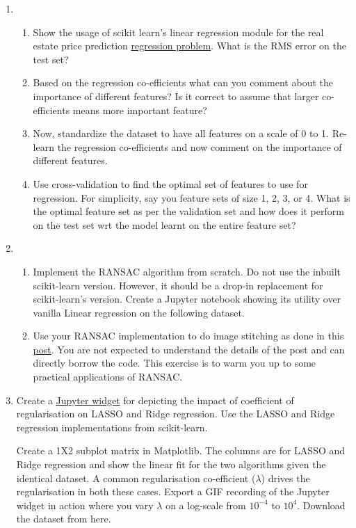 \documentclass[]{article}
\begin{document}
\begin{enumerate}
	
	\item 
\begin{enumerate}
	\item 	Show the usage of scikit learn's linear regression module for the real estate price prediction \href{https://archive.ics.uci.edu/ml/datasets/Real+estate+valuation+data+set}{regression problem}.  What is the RMS error on the test set? 
	\item Based on the regression co-efficients what can you comment about the importance of different features? Is it correct to assume that larger co-efficients means more important feature?
	\item Now, standardize the dataset to have all features on a scale of 0 to 1. Re-learn the regression co-efficients and now comment on the importance of different features.
	\item Use cross-validation to find the optimal set of features to use for regression. For simplicity, say you feature sets of size 1, 2, 3, or 4. What is the optimal feature set as per the validation set and how does it perform on the test set wrt the model learnt on the entire feature set?
	
\end{enumerate}

\item \begin{enumerate}
	\item Implement the RANSAC algorithm from scratch. Do not use the inbuilt scikit-learn version. However, it should be a drop-in replacement for scikit-learn's version. Create a Jupyter notebook showing its utility over vanilla Linear regression on the following dataset.
	\item Use your RANSAC implementation to do image stitching as done in this \href{https://www.pyimagesearch.com/2016/01/11/opencv-panorama-stitching/}{post}. You are not expected to understand the details of the post and can directly borrow the code. This exercise is to warm you up to some practical applications of RANSAC.
\end{enumerate}

\item Create a \href{https://ipywidgets.readthedocs.io/en/stable/examples/Widget\%20Basics.html}{Jupyter widget} for depicting the impact of coefficient of regularisation on LASSO and Ridge regression. Use the LASSO and Ridge regression implementations from scikit-learn.

Create a 1X2 subplot matrix in Matplotlib. The columns are for LASSO and Ridge regression and show the linear fit for the two algorithms given the identical dataset. A common regularisation co-efficient ($\lambda$) drives the regularisation in both these cases. Export a GIF recording of the Jupyter widget in action where you vary $\lambda$ on a log-scale from $10^{-4}$ to $10^{4}$. Download the dataset from here.


\end{enumerate}
\end{document}

